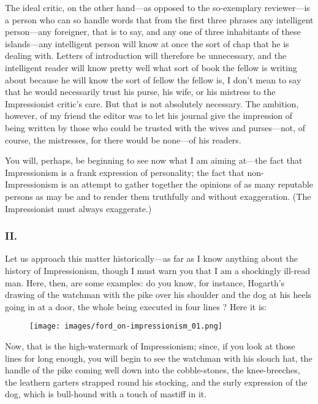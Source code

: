 The ideal critic, on the other hand---as opposed to the so-exemplary
reviewer---is a person who can so handle words that from the first three
phrases any intelligent person---any foreigner, that is to say, and any
one of three inhabitants of these islands---any intelligent person will
know at once the sort of chap that he is dealing with. Letters of
introduction will therefore be unnecessary, and the intelligent reader
will know pretty well what sort of book the fellow is writing about
because he will know the sort of fellow the fellow is, I don't mean to
say that he would necessarily trust his purse, his wife, or his mistress
to the Impressionist critic's care. But that is not absolutely
necessary. The ambition, however, of my friend the editor was to let his
journal give the impression of being written by those who could be
trusted with the wives and purses---not, of course, the mistresses, for
there would be none---of his readers.

You will, perhaps, be beginning to see now what I am aiming at---the
fact that Impressionism is a frank expression of personality; the fact
that non-Impressionism is an attempt to gather together the opinions of
as many reputable persons as may be and to render them truthfully and
without exaggeration. (The Impressionist must always exaggerate.)

\subsubsection{II.}\label{ii.}

Let us approach this matter historically---as far as I know anything
about the history of Impressionism, though I must warn you that I am a
shockingly ill-read man. Here, then, are some examples: do you know, for
instance, Hogarth's drawing of the watchman with the pike over his
shoulder and the dog at his heels going in at a door, the whole being
executed in four lines ? Here it is:

\begin{figure}[htbp]
\centering
\texttt{[image: images/ford\_on-impressionism\_01.png]}
\end{figure}

Now, that is the high-watermark of Impressionism; since, if you look at
those lines for long enough, you will begin to see the watchman with his
slouch hat, the handle of the pike coming well down into the
cobble-stones, the knee-breeches, the leathern garters strapped round
his stocking, and the surly expression of the dog, which is bull-hound
with a touch of mastiff in it.

